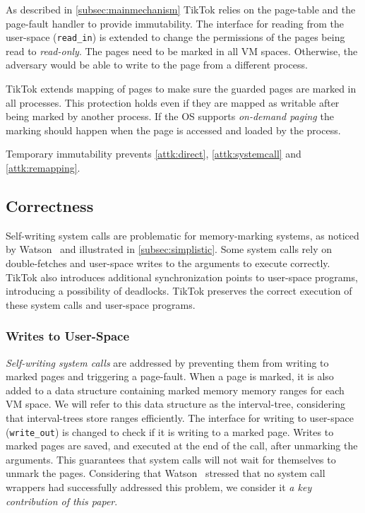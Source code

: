 \documentclass[conference]{IEEEtran}
\newcommand{\sysname}{TikTok}
\begin{document}
As described in \autoref{subsec:mainmechanism} \sysname{} relies on the
page-table and the page-fault handler to provide immutability. The interface for
reading from the user-space (\texttt{read\_in}) is extended to change the
permissions of the pages being read to \emph{read-only}. The pages need to be
marked in all VM spaces. Otherwise, the adversary would be able to write to the
page from a different process.

\sysname{} extends mapping of pages to make sure the guarded pages are marked in
all processes. This protection holds even if they are mapped as writable after
being marked by another process. If the OS supports \emph{on-demand paging} the
marking should happen when the page is accessed and loaded by the process.

Temporary immutability prevents \autoref{attk:direct}, \autoref{attk:systemcall}
and \autoref{attk:remapping}.

\subsection{Correctness}
\label{subsec:correctness}
Self-writing system calls are problematic for memory-marking systems, as noticed
by Watson~\cite{watson2007exploiting} and illustrated in
\autoref{subsec:simplistic}. Some system calls rely on double-fetches and
user-space writes to the arguments to execute correctly. \sysname{} also
introduces additional synchronization points to user-space programs, introducing
a possibility of deadlocks. \sysname{} preserves the correct execution of
these system calls and user-space programs.

\subsubsection{Writes to User-Space}

\emph{Self-writing system calls} are addressed by preventing them from writing
to marked pages and triggering a page-fault. When a page is marked, it is also
added to a data structure containing marked memory memory ranges for each VM
space. We will refer to this data structure as the interval-tree, considering
that interval-trees store ranges efficiently. The interface for writing to
user-space (\texttt{write\_out}) is changed to check if it is writing to a
marked page. Writes to marked pages are saved, and executed at the end of the
call, after unmarking the arguments. This guarantees that system calls will not
wait for themselves to unmark the pages. Considering that
Watson~\cite{watson2007exploiting} stressed that no system call wrappers had
successfully addressed this problem, we consider it \emph{a key contribution of
this paper}.
\end{document}
